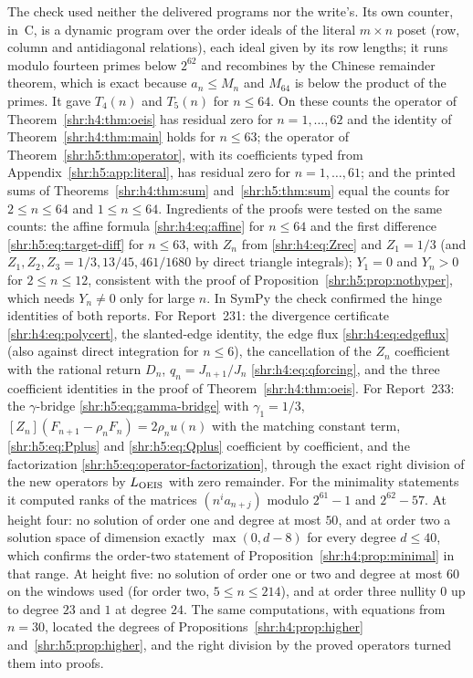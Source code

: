 \documentclass[11pt,letterpaper]{article}
\numberwithin{equation}{section}
\theoremstyle{definition}
\newcommand{\1}{\mathbf 1}
\begin{document}
The check used neither the delivered programs nor the write's. Its own
counter, in~C, is a dynamic program over the order ideals of the literal
$m\times n$ poset (row, column and antidiagonal relations), each ideal
given by its row lengths; it runs modulo fourteen primes below $2^{62}$
and recombines by the Chinese remainder theorem, which is exact because
$a_n\le M_n$ and $M_{64}$ is below the product of the primes. It gave
$T_4(n)$ and $T_5(n)$ for $n\le64$. On these counts the operator of
Theorem~\ref{shr:h4:thm:oeis} has residual zero for $n=1,\ldots,62$ and the
identity of Theorem~\ref{shr:h4:thm:main} holds for $n\le63$; the operator
of Theorem~\ref{shr:h5:thm:operator}, with its coefficients typed from
Appendix~\ref{shr:h5:app:literal}, has residual zero for $n=1,\ldots,61$;
and the printed sums of Theorems~\ref{shr:h4:thm:sum}
and~\ref{shr:h5:thm:sum} equal the counts for $2\le n\le64$ and
$1\le n\le64$. Ingredients of the proofs were tested on the same counts:
the affine formula \eqref{shr:h4:eq:affine} for $n\le64$ and the first
difference \eqref{shr:h5:eq:target-diff} for $n\le63$, with $Z_n$ from
\eqref{shr:h4:eq:Zrec} and $Z_1=1/3$ (and $Z_1,Z_2,Z_3=1/3,13/45,461/1680$
by direct triangle integrals); $Y_1=0$ and $Y_n>0$ for $2\le n\le12$,
consistent with the proof of Proposition~\ref{shr:h5:prop:nothyper}, which
needs $Y_n\ne0$ only for large $n$. In SymPy the check confirmed the hinge
identities of both reports. For Report~231: the divergence certificate
\eqref{shr:h4:eq:polycert}, the slanted-edge identity, the edge flux
\eqref{shr:h4:eq:edgeflux} (also against direct integration for $n\le6$),
the cancellation of the $Z_n$ coefficient with the rational return $D_n$,
$q_n=J_{n+1}/J_n$ \eqref{shr:h4:eq:qforcing}, and the three coefficient
identities in the proof of Theorem~\ref{shr:h4:thm:oeis}. For Report~233:
the $\gamma$-bridge \eqref{shr:h5:eq:gamma-bridge} with $\gamma_1=1/3$,
$[Z_n](F_{n+1}-\rho_nF_n)=2\rho_nu(n)$ with the matching constant term,
\eqref{shr:h5:eq:Pplus} and \eqref{shr:h5:eq:Qplus} coefficient by
coefficient, and the factorization
\eqref{shr:h5:eq:operator-factorization}, through the exact right division
of the new operators by $L_{\rm OEIS}$ with zero remainder. For the
minimality statements it computed ranks of the matrices $(n^ia_{n+j})$
modulo $2^{61}-1$ and $2^{62}-57$. At height four: no solution of order one
and degree at most $50$, and at order two a solution space of dimension
exactly $\max(0,d-8)$ for every degree $d\le40$, which confirms the
order-two statement of Proposition~\ref{shr:h4:prop:minimal} in that
range. At height five: no solution of order one or two and degree at most
$60$ on the windows used (for order two, $5\le n\le214$), and at order
three nullity $0$ up to degree $23$ and $1$ at degree $24$. The same
computations, with equations from $n=30$, located the degrees of
Propositions~\ref{shr:h4:prop:higher} and~\ref{shr:h5:prop:higher}, and
the right division by the proved operators turned them into proofs.
\end{document}
